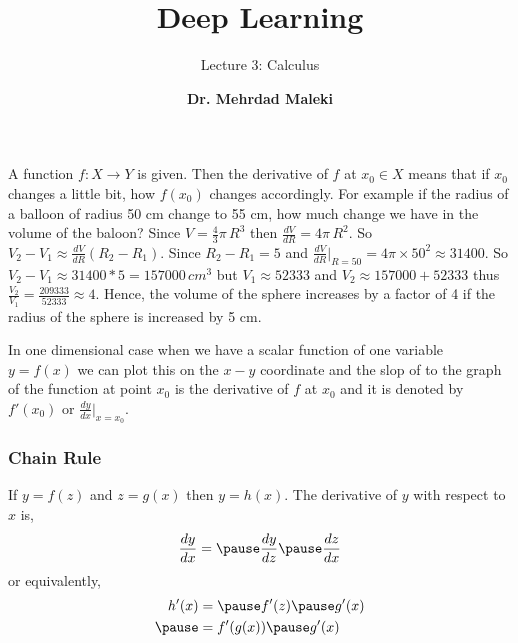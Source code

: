 \documentclass[12pt,aspectratio=169]{beamer}
\title{Deep Learning}
\subtitle{Lecture 3: Calculus}
\author[]{\textbf{Dr. Mehrdad Maleki}}
\date{}
\newcommand{\at}[2][]{#1|_{#2}}
\begin{document}
 
\frame{\titlepage}

\begin{frame}
A function $f:X\to Y$ is given. \pause Then the derivative of $f$ at $x_0\in X$ means that if $x_0$ changes a little bit, how $f(x_0)$ changes accordingly. \pause For example if the radius of a balloon of radius 50 cm change to  55 cm, how much change we have in the volume of the baloon? \pause Since $V=\frac{4}{3}\pi\,R^3$ then $\frac{dV}{dR}=4\pi\,R^2$. \pause So $V_2-V_1\approx\frac{dV}{dR}(R_2-R_1)$. \pause Since $R_2-R_1=5$ and $\frac{dV}{dR}|_{R=50}=4\pi\times 50^2\approx 31400$. So $V_2-V_1\approx 31400*5=157000\, cm^3$ but $V_1\approx 52333$ and $V_2\approx 157000+52333$ thus $\frac{V_2}{V_1}=\frac{209333}{52333}\approx 4$. Hence, the volume of the sphere increases by a factor of 4 if the radius of the sphere is increased by 5 cm.
\end{frame}

\begin{frame}
In one dimensional case when we have a scalar function of one variable $y=f(x)$ we can plot this on the $x-y$ coordinate and the slop of to the graph of the function at point $x_0$ is the derivative of $f$ at $x_0$ and it is denoted by $f'(x_0)$ or $\frac{dy}{dx}\at[\big]{x=x_0}$.
\begin{figure}
\end{figure}
\end{frame}


\begin{frame}
\frametitle{Chain Rule}
If $y=f(z)$ and $z=g(x)$ then $y=h(x)$. The derivative of $y$ with respect to $x$ is, \pause
\[
\frac{dy}{dx}=\pause\frac{dy}{dz}\pause\frac{dz}{dx}
\]\pause
or equivalently,
\[
\begin{aligned}
h'(x)&=\pause f'(z)\pause g'(x)\\ \pause
&=f'(g(x))\pause g'(x)
\end{aligned}
\]

\end{frame}
\end{document}
